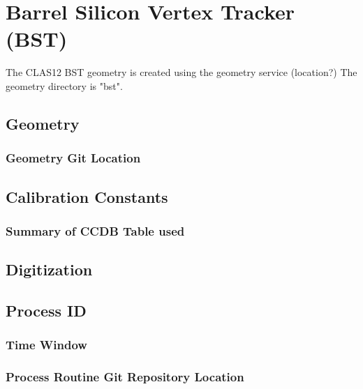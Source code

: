 \section{Barrel Silicon Vertex Tracker (BST)}

The CLAS12 BST geometry is created using the geometry service (location?)
The geometry directory is "bst".


\subsection{Geometry}

\subsubsection{Geometry Git Location}

\subsection{Calibration Constants}

\subsubsection{Summary of CCDB Table used}

\subsection{Digitization}

\subsection{Process ID}

\subsubsection{Time Window}

\subsubsection{Process Routine Git Repository Location}


